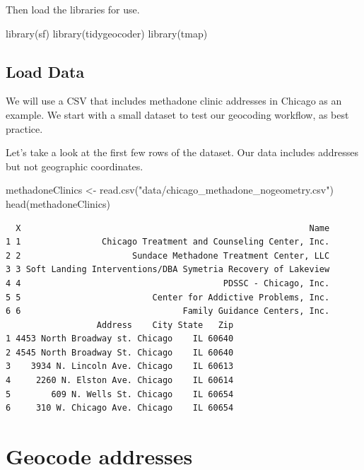 \documentclass[
  letterpaper,
  DIV=11,
  numbers=noendperiod]{scrreprt}
\newenvironment{Shaded}{\begin{snugshade}}{\end{snugshade}}
\newcommand{\FunctionTok}[1]{\textcolor[rgb]{0.28,0.35,0.67}{#1}}
\newcommand{\NormalTok}[1]{\textcolor[rgb]{0.00,0.23,0.31}{#1}}
\newcommand{\OtherTok}[1]{\textcolor[rgb]{0.00,0.23,0.31}{#1}}
\newcommand{\StringTok}[1]{\textcolor[rgb]{0.13,0.47,0.30}{#1}}
\begin{document}
Then load the libraries for use.

\begin{Shaded}
\begin{Highlighting}[]
\FunctionTok{library}\NormalTok{(sf)}
\FunctionTok{library}\NormalTok{(tidygeocoder)}
\FunctionTok{library}\NormalTok{(tmap)}
\end{Highlighting}
\end{Shaded}

\subsection{Load Data}\label{load-data-1}

We will use a CSV that includes methadone clinic addresses in Chicago as
an example. We start with a small dataset to test our geocoding
workflow, as best practice.

Let's take a look at the first few rows of the dataset. Our data
includes addresses but not geographic coordinates.

\begin{Shaded}
\begin{Highlighting}[]
\NormalTok{methadoneClinics }\OtherTok{\textless{}{-}} \FunctionTok{read.csv}\NormalTok{(}\StringTok{"data/chicago\_methadone\_nogeometry.csv"}\NormalTok{)}
\FunctionTok{head}\NormalTok{(methadoneClinics)}
\end{Highlighting}
\end{Shaded}

\begin{verbatim}
  X                                                         Name
1 1                Chicago Treatment and Counseling Center, Inc.
2 2                      Sundace Methadone Treatment Center, LLC
3 3 Soft Landing Interventions/DBA Symetria Recovery of Lakeview
4 4                                        PDSSC - Chicago, Inc.
5 5                          Center for Addictive Problems, Inc.
6 6                                Family Guidance Centers, Inc.
                  Address    City State   Zip
1 4453 North Broadway st. Chicago    IL 60640
2 4545 North Broadway St. Chicago    IL 60640
3    3934 N. Lincoln Ave. Chicago    IL 60613
4     2260 N. Elston Ave. Chicago    IL 60614
5        609 N. Wells St. Chicago    IL 60654
6     310 W. Chicago Ave. Chicago    IL 60654
\end{verbatim}

\section{Geocode addresses}\label{GA-geocode-addresses}
\end{document}
